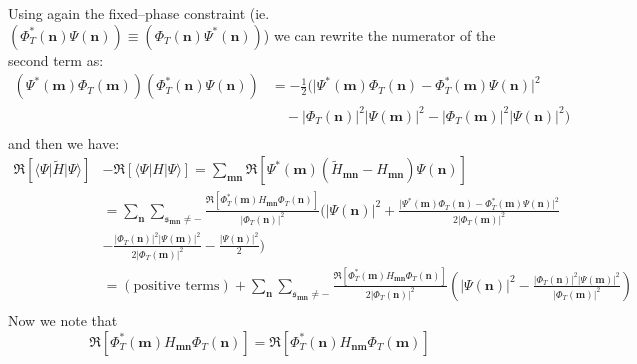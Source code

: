 Using again the fixed--phase constraint (ie. $(\Phi_T^*(\mathbf{n})\Psi(\mathbf{n})) \equiv (\Phi_T(\mathbf{n})\Psi^*(\mathbf{n}))$) we can rewrite the numerator of the second term as:
\begin{equation}
\begin{split}
(\Psi^*(\mathbf{m}) \Phi_T(\mathbf{m}))  (\Phi_T^*(\mathbf{n})\Psi(\mathbf{n})) &= -\frac{1}{2} \big( \lvert \Psi^*(\mathbf{m}) \Phi_T(\mathbf{n}) - \Phi_T^*(\mathbf{m})\Psi(\mathbf{n})\rvert^2 \\
&\quad- \lvert \Phi_T(\mathbf{n})\rvert^2\lvert \Psi(\mathbf{m})\rvert^2 -\lvert \Phi_T(\mathbf{m})\rvert^2\lvert \Psi(\mathbf{n})\rvert^2 \big)\\
\end{split}
\end{equation}
and then we have:
\begin{equation}
\begin{split}
 \Re \left[\langle \Psi \lvert \widetilde{H}\rvert\Psi \rangle\right] & -\Re\left[ \langle \Psi |H|\Psi \rangle\right]=  \sum_{\mathbf{m}\mathbf{n}} \Re \left[\Psi^*(\mathbf{m}) (\widetilde{H}_{\mathbf{m}\mathbf{n}}-H_{\mathbf{m}\mathbf{n}})\Psi(\mathbf{n})\right]\\ 
&= \sum_{\mathbf{n}} \sum_{\mathfrak{s}_{\mathbf{m}\mathbf{n}} \neq -} \frac{\Re \left [ \Phi_T^*(\mathbf{m}) H_{\mathbf{m}\mathbf{n}} \Phi_T(\mathbf{n})\right ]}{ \lvert \Phi_T(\mathbf{n}) \rvert ^2}\bigg( \lvert\Psi(\mathbf{n})\rvert^2  + \frac{ \lvert \Psi^*(\mathbf{m}) \Phi_T(\mathbf{n}) - \Phi_T^*(\mathbf{m})\Psi(\mathbf{n})\rvert^2}{2 \lvert\Phi_T(\mathbf{m})\rvert^2} \\  
&- \frac{ \lvert \Phi_T(\mathbf{n})\rvert^2\lvert \Psi(\mathbf{m})\rvert^2}{2\lvert\Phi_T(\mathbf{m})\rvert^2}- \frac{ \lvert \Psi(\mathbf{n})\rvert^2}{2}\bigg)\\
&= (\mbox{positive terms}) + \sum_{\mathbf{n}} \sum_{\mathfrak{s}_{\mathbf{m}\mathbf{n}} \neq -} \frac{\Re \left [ \Phi_T^*(\mathbf{m}) H_{\mathbf{m}\mathbf{n}} \Phi_T(\mathbf{n})\right ]}{ 2\lvert \Phi_T(\mathbf{n}) \rvert ^2}\left( \lvert\Psi(\mathbf{n})\rvert^2  - \frac{ \lvert \Phi_T(\mathbf{n})\rvert^2\lvert \Psi(\mathbf{m})\rvert^2}{\lvert\Phi_T(\mathbf{m})\rvert^2} \right) \\  
\end{split}
\end{equation}
Now we note that 
\begin{equation*}
\Re \left [ \Phi_T^*(\mathbf{m}) H_{\mathbf{m}\mathbf{n}} \Phi_T(\mathbf{n})\right ] = \Re \left [ \Phi_T^*(\mathbf{n}) H_{\mathbf{n}\mathbf{m}} \Phi_T(\mathbf{m})\right ]
\end{equation*}
